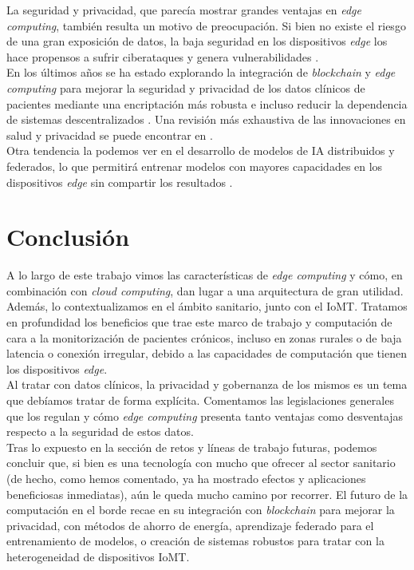 \documentclass[twoside, 12pt]{opticajnl}
\begin{document}
La seguridad y privacidad, que parecía mostrar grandes ventajas en \textit{edge computing}, también resulta un motivo de preocupación. Si bien no existe el riesgo de una gran exposición de datos, la baja seguridad en los dispositivos \textit{edge} los hace propensos a sufrir ciberataques y genera vulnerabilidades . \\

En los últimos años se ha estado explorando la integración de \textit{blockchain} y \textit{edge computing} para mejorar la seguridad y privacidad de los datos clínicos de pacientes mediante una encriptación más robusta  e incluso reducir la dependencia de sistemas descentralizados . Una revisión más exhaustiva de las innovaciones en salud y privacidad se puede encontrar en . \\

Otra tendencia la podemos ver en el desarrollo de modelos de IA distribuidos y federados, lo que permitirá entrenar modelos con mayores capacidades en los dispositivos \textit{edge} sin compartir los resultados . 

\section{Conclusión}

A lo largo de este trabajo vimos las características de \textit{edge computing} y cómo, en combinación con \textit{cloud computing}, dan lugar a una arquitectura de gran utilidad. Además, lo contextualizamos en el ámbito sanitario, junto con el IoMT. Tratamos en profundidad los beneficios que trae este marco de trabajo y computación de cara a la monitorización de pacientes crónicos, incluso en zonas rurales o de baja latencia o conexión irregular, debido a las capacidades de computación que tienen los dispositivos \textit{edge}. \\

Al tratar con datos clínicos, la privacidad y gobernanza de los mismos es un tema que debíamos tratar de forma explícita. Comentamos las legislaciones generales que los regulan y cómo \textit{edge computing} presenta tanto ventajas como desventajas respecto a la seguridad de estos datos. \\

Tras lo expuesto en la sección de retos y líneas de trabajo futuras, podemos concluir que, si bien es una tecnología con mucho que ofrecer al sector sanitario (de hecho, como hemos comentado, ya ha mostrado efectos y aplicaciones beneficiosas inmediatas), aún le queda mucho camino por recorrer. El futuro de la computación en el borde recae en su integración con \textit{blockchain} para mejorar la privacidad, con métodos de ahorro de energía, aprendizaje federado para el entrenamiento de modelos, o creación de sistemas robustos para tratar con la heterogeneidad de dispositivos IoMT.


\printbibliography[heading=bibintoc, title={Referencias}]
\end{document}

